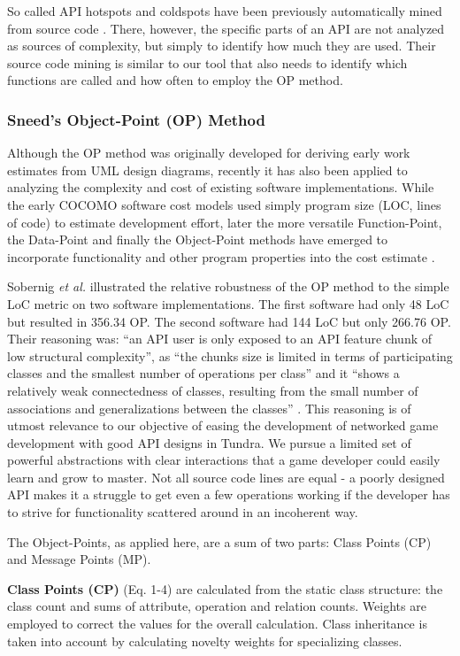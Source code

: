 \documentclass[conference]{IEEEtran}
\begin{document}
So called API hotspots and coldspots have been previously
automatically mined from source code \cite{spotweb}. There, however,
the specific parts of an API are not analyzed as sources of complexity,
but simply to identify how much they are used. Their source code
mining is similar to our tool that also needs to identify which
functions are called and how often to employ the OP method.

\subsubsection{Sneed's Object-Point (OP) Method}

Although the OP method was originally developed for deriving early
work estimates from UML design diagrams, recently it has also been
applied to analyzing the complexity and cost of existing software
implementations. While the early COCOMO software cost models used
simply program size (LOC, lines of code) to estimate development
effort, later the more versatile Function-Point, the Data-Point and
finally the Object-Point methods have emerged to incorporate
functionality and other program properties into the cost estimate
\cite{henrich97repositorybased}.

Sobernig \emph{et al.} illustrated the relative robustness of the OP
method to the simple LoC metric on two software implementations. The
first software had only 48 LoC but resulted in 356.34 OP. The second
software had 144 LoC but only 266.76 OP. Their reasoning was: “an API
user is only exposed to an API feature chunk of low structural
complexity”, as “the chunks size is limited in terms of participating
classes and the smallest number of operations per class” and it “shows
a relatively weak connectedness of classes, resulting from the small
number of associations and generalizations between the classes”
\cite{api-complexity-analysis}. This reasoning is of utmost relevance
to our objective of easing the development of networked game
development with good API designs in Tundra. We pursue a limited set
of powerful abstractions with clear interactions that a game developer
could easily learn and grow to master. Not all source code lines are
equal - a poorly designed API makes it a struggle to get even a few
operations working if the developer has to strive for functionality
scattered around in an incoherent way.

The Object-Points, as applied here, are a sum of two parts: Class
Points (CP) and Message Points (MP).

\textbf{Class Points (CP)} (Eq. 1-4) are calculated from the static class structure: the
class count and sums of attribute, operation and relation
counts. Weights are employed to correct the values for the overall
calculation. Class inheritance is taken into account by calculating
novelty weights for specializing classes.
\end{document}
